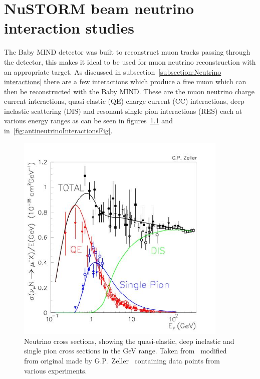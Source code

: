 \chapter{NuSTORM beam neutrino interaction studies}
\label{c:neutrinoNuSTORM}

The Baby MIND detector was built to reconstruct muon tracks passing through the detector, this makes it ideal to be used for muon neutrino reconstruction with an appropriate target. As discussed in subsection~\ref{subsection:Neutrino interactions} there are a few interactions which produce a free muon which can then be reconstructed with the Baby MIND. These are the muon neutrino charge current interactions, quasi-elastic (QE) charge current (CC) interactions, deep inelastic scattering (DIS) and resonant single pion interactions (RES) each at various energy ranges as can be seen in figures~\ref{fig:neutrinoInteractionsFig} and in~\ref{fig:antineutrinoInteractionsFig}.

\begin{figure}[h!]
\centering
\includegraphics[width=0.9\textwidth]{figures/figs_zeller-total-numode.png}
\caption{Neutrino cross sections, showing the quasi-elastic, deep inelastic and single pion cross sections in the GeV range. Taken from~\cite{82McFarland} modified from original made by G.P.~Zeller~\cite{106Zeller} containing data points from various experiments.}
\label{fig:neutrinoInteractionsFig}
\end{figure}

